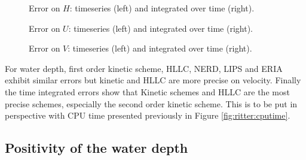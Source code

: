 \begin{figure}[H]
\begin{minipage}[t]{0.45\textwidth}
 \centering
\end{minipage}
\begin{minipage}[t]{0.55\textwidth}
 \centering
\end{minipage}
  \caption{Error on $H$: timeseries (left) and integrated over time (right).}
  \label{fig:ritter:ErrNumH}
\end{figure}

\begin{figure}[H]
\begin{minipage}[t]{0.45\textwidth}
 \centering
\end{minipage}
\begin{minipage}[t]{0.55\textwidth}
 \centering
\end{minipage}
  \caption{Error on $U$: timeseries (left) and integrated over time (right).}
  \label{fig:ritter:ErrNumU}
\end{figure}

\begin{figure}[H]
\begin{minipage}[t]{0.45\textwidth}
 \centering
\end{minipage}
\begin{minipage}[t]{0.55\textwidth}
 \centering
\end{minipage}
  \caption{Error on $V$: timeseries (left) and integrated over time (right).}
  \label{fig:ritter:ErrNumV}
\end{figure}

For water depth, first order kinetic scheme, HLLC, NERD, LIPS and ERIA exhibit
similar errors but kinetic and HLLC are more precise on velocity.
Finally the time integrated errors show that Kinetic schemes and HLLC are the
most precise schemes, especially the second order kinetic scheme.
This is to be put in perspective with CPU time presented previously
in Figure \ref{fig:ritter:cputime}.

\subsection{Positivity of the water depth}

